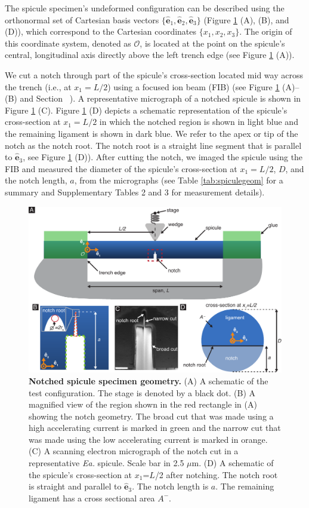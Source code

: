 \documentclass[12pt,onecolumn]{article}
\makeatletter
\DeclareRobustCommand*{\nameref}[1]{%
      \emph{\myorg@nameref{#1}}%
    }%
\newcommand{\ex}{\hat{\mathbf{e}}_1}
\newcommand{\ey}{\hat{\mathbf{e}}_2}
\newcommand{\ez}{\hat{\mathbf{e}}_3}
\newcommand{\EA}{\textit{Ea.\@}\xspace}
\makeatother
\begin{document}
The spicule specimen's undeformed configuration can be described using the orthonormal set of Cartesian basis vectors $\{\ex,\ey,\ez\}$ (Figure \ref{fig:notch} (A), (B), and (D)), which correspond to the Cartesian coordinates $\{x_1,x_2,x_3\}$. The origin of this coordinate system, denoted as $\mathcal{O}$, is located at the point on the spicule's central, longitudinal axis directly above the left trench edge (see Figure \ref{fig:notch} (A)).

We cut a notch through part of the spicule's cross-section located mid way across the trench (i.e., at $x_1=L/2$) using a focused ion beam (FIB) (see Figure \ref{fig:notch} (A)--(B) and Section~\nameref{sec:notchconfig}). A representative micrograph of a notched spicule is shown in Figure \ref{fig:notch} (C). Figure \ref{fig:notch} (D) depicts a schematic representation of the spicule's cross-section at $x_1=L/2$ in which the notched region is shown in light blue and the remaining ligament is shown in dark blue. We refer to the apex or tip of the notch as the notch root. The notch root is a straight line segment that is parallel to $\ez$, see Figure \ref{fig:notch} (D)). After cutting the notch, we imaged the spicule using the FIB and measured the diameter of the spicule's cross-section at $x_1=L/2$, $D$, and the notch length, $a$, from the micrographs (see Table \ref{tab:spiculegeom} for a summary and Supplementary Tables 2 and 3 for measurement details). 
%
			\begin{figure}[hb!]
			\centering
			\includegraphics[width=\textwidth]{../Figures/FigureNotch/Figure3_V7.pdf}
			\caption{\textbf{Notched spicule specimen geometry.} (A) A schematic of the test configuration. The stage is denoted by a black dot. (B) A magnified view of the region shown in the red rectangle in (A) showing the notch geometry. The broad cut that was made using a high accelerating current is marked in green and the narrow cut that was made using the low accelerating current is marked in orange. (C) A scanning electron micrograph of the notch cut in a representative \EA spicule. Scale bar in 2.5 $\mu$m. (D) A schematic of the spicule's cross-section at $x_1$=$L$/2 after notching. The notch root is straight and parallel to $\ez$. The notch length is $a$. The remaining ligament has a cross sectional area $A^-$.}
			\label{fig:notch}
			\end{figure}
\end{document}
